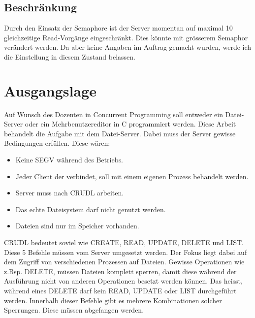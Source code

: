 \documentclass[12pt,a4paper,ngerman]{report}
\begin{document}
\section{Beschränkung}
Durch den Einsatz der Semaphore ist der Server momentan auf maximal 10 gleichzeitige Read-Vorgänge eingeschränkt. Dies könnte mit grösserem Semaphor verändert werden. Da aber keine Angaben im Auftrag gemacht wurden, werde ich die Einstellung in diesem Zustand belassen.
\chapter{Ausgangslage}
Auf Wunsch des Dozenten in Concurrent Programming soll entweder ein Datei-Server oder ein Mehrbenutzereditor in C programmiert werden. Diese Arbeit behandelt die Aufgabe mit dem Datei-Server. Dabei muss der Server gewisse Bedingungen erfüllen. Diese wären:
\begin{itemize}
	\item Keine SEGV während des Betriebs.
	\item Jeder Client der verbindet, soll mit einem eigenen Prozess behandelt werden.
	\item Server muss nach CRUDL arbeiten.
	\item Das echte Dateisystem darf nicht genutzt werden.
	\item Dateien sind nur im Speicher vorhanden.
\end{itemize}

CRUDL bedeutet soviel wie CREATE, READ, UPDATE, DELETE und LIST. Diese 5 Befehle müssen vom Server umgesetzt werden. Der Fokus liegt dabei auf dem Zugriff von verschiedenen Prozessen auf Dateien. Gewisse Operationen wie z.Bsp. DELETE, müssen Dateien komplett sperren, damit diese während der Ausführung nicht von anderen Operationen besetzt werden können. Das heisst, während eines DELETE darf kein READ, UPDATE oder LIST durchgeführt werden. Innerhalb dieser Befehle gibt es mehrere Kombinationen solcher Sperrungen. Diese müssen abgefangen werden.
\end{document}
